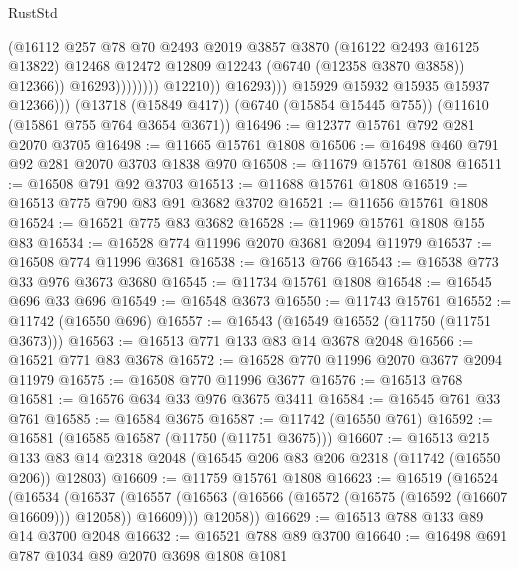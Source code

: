 \begin{lexlean}{RustStd}
\begin{coremodule}
                                      (@16112
                                        @257
                                        @78
                                        @70
                                        @2493
                                        @2019
                                        @3857
                                        @3870
                                        (@16122 @2493 @16125 @13822)
                                        @12468
                                        @12472
                                        @12809
                                        @12243
                                        (@6740 (@12358 @3870 @3858))
                                        @12366))
                                    @16293))))))))
                    @12210))
                @16293)))
          @15929
          @15932
          @15935
          @15937
          @12366)))
    (@13718 (@15849 @417))
    (@6740 (@15854 @15445 @755))
    (@11610 (@15861 @755 @764 @3654 @3671))
@16496 := @12377 @15761 @792 @281 @2070 @3705
@16498 := @11665 @15761 @1808
@16506 := @16498 @460 @791 @92 @281 @2070 @3703 @1838 @970
@16508 := @11679 @15761 @1808
@16511 := @16508 @791 @92 @3703
@16513 := @11688 @15761 @1808
@16519 := @16513 @775 @790 @83 @91 @3682 @3702
@16521 := @11656 @15761 @1808
@16524 := @16521 @775 @83 @3682
@16528 := @11969 @15761 @1808 @155 @83
@16534 := @16528 @774 @11996 @2070 @3681 @2094 @11979
@16537 := @16508 @774 @11996 @3681
@16538 := @16513 @766
@16543 := @16538 @773 @33 @976 @3673 @3680
@16545 := @11734 @15761 @1808
@16548 := @16545 @696 @33 @696
@16549 := @16548 @3673
@16550 := @11743 @15761
@16552 := @11742 (@16550 @696)
@16557 := @16543 (@16549 @16552 (@11750 (@11751 @3673)))
@16563 := @16513 @771 @133 @83 @14 @3678 @2048
@16566 := @16521 @771 @83 @3678
@16572 := @16528 @770 @11996 @2070 @3677 @2094 @11979
@16575 := @16508 @770 @11996 @3677
@16576 := @16513 @768
@16581 := @16576 @634 @33 @976 @3675 @3411
@16584 := @16545 @761 @33 @761
@16585 := @16584 @3675
@16587 := @11742 (@16550 @761)
@16592 := @16581 (@16585 @16587 (@11750 (@11751 @3675)))
@16607 := @16513
    @215
    @133
    @83
    @14
    @2318
    @2048
    (@16545 @206 @83 @206 @2318 (@11742 (@16550 @206)) @12803)
@16609 := @11759 @15761 @1808
@16623 := @16519
    (@16524
      (@16534
        (@16537 (@16557 (@16563 (@16566 (@16572 (@16575 (@16592 (@16607 @16609))) @12058)) @16609)))
        @12058))
@16629 := @16513 @788 @133 @89 @14 @3700 @2048
@16632 := @16521 @788 @89 @3700
@16640 := @16498 @691 @787 @1034 @89 @2070 @3698 @1808 @1081

\end{coremodule}
\end{lexlean}
